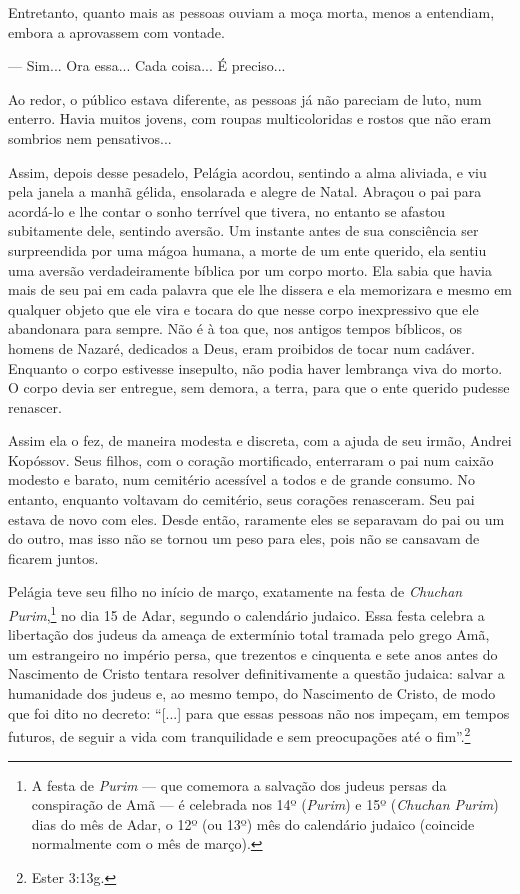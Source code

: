 Entretanto, quanto mais as pessoas ouviam a moça morta, menos a
entendiam, embora a aprovassem com vontade.

--- Sim... Ora essa... Cada coisa... É preciso...

Ao redor, o público estava diferente, as pessoas já não pareciam de
luto, num enterro. Havia muitos jovens, com roupas multicoloridas e
rostos que não eram sombrios nem pensativos...

Assim, depois desse pesadelo, Pelágia acordou, sentindo a alma aliviada,
e viu pela janela a manhã gélida, ensolarada e alegre de Natal. Abraçou
o pai para acordá-lo e lhe contar o sonho terrível que tivera, no
entanto se afastou subitamente dele, sentindo aversão. Um instante antes
de sua consciência ser surpreendida por uma mágoa humana, a morte de um
ente querido, ela sentiu uma aversão verdadeiramente bíblica por um
corpo morto. Ela sabia que havia mais de seu pai em cada palavra que ele
lhe dissera e ela memorizara e mesmo em qualquer objeto que ele vira e
tocara do que nesse corpo inexpressivo que ele abandonara para sempre.
Não é à toa que, nos antigos tempos bíblicos, os homens de Nazaré,
dedicados a Deus, eram proibidos de tocar num cadáver. Enquanto o corpo
estivesse insepulto, não podia haver lembrança viva do morto. O corpo
devia ser entregue, sem demora, a terra, para que o ente querido pudesse
renascer.

Assim ela o fez, de maneira modesta e discreta, com a ajuda de seu
irmão, Andrei Kopóssov. Seus filhos, com o coração mortificado,
enterraram o pai num caixão modesto e barato, num cemitério acessível a
todos e de grande consumo. No entanto, enquanto voltavam do cemitério,
seus corações renasceram. Seu pai estava de novo com eles. Desde então,
raramente eles se separavam do pai ou um do outro, mas isso não se
tornou um peso para eles, pois não se cansavam de ficarem juntos.

Pelágia teve seu filho no início de março, exatamente na festa de
\emph{Chuchan Purim},\footnote{A festa de \emph{Purim} --- que comemora
  a salvação dos judeus persas da conspiração de Amã --- é celebrada nos
  14º (\emph{Purim}) e 15º (\emph{Chuchan Purim}) dias do mês de Adar, o
  12º (ou 13º) mês do calendário judaico (coincide normalmente com o mês
  de março).} no dia 15 de Adar, segundo o calendário judaico. Essa
festa celebra a libertação dos judeus da ameaça de extermínio total
tramada pelo grego Amã, um estrangeiro no império persa, que trezentos e
cinquenta e sete anos antes do Nascimento de Cristo tentara resolver
definitivamente a questão judaica: salvar a humanidade dos judeus e, ao
mesmo tempo, do Nascimento de Cristo, de modo que foi dito no decreto:
``{[}...{]} para que essas pessoas não nos impeçam, em tempos futuros,
de seguir a vida com tranquilidade e sem preocupações até o
fim''.\footnote{Ester 3:13g.}

